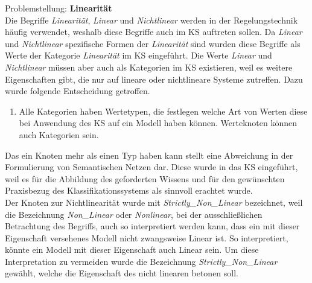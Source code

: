 Problemstellung: \textbf{Linearität}\\
Die Begriffe \textit{Linearität}, \textit{Linear} und \textit{Nichtlinear} werden in der Regelungstechnik häufig verwendet, weshalb diese Begriffe auch im KS auftreten sollen. Da \textit{Linear} und \textit{Nichtlinear} spezifische Formen der \textit{Linearität} sind wurden diese Begriffe als Werte der Kategorie \textit{Linearität} im KS eingeführt. Die Werte \textit{Linear} und \textit{Nichtlinear} müssen aber auch als Kategorien im KS existieren, weil es weitere Eigenschaften gibt, die nur auf lineare oder nichtlineare Systeme zutreffen. Dazu wurde folgende Entscheidung getroffen.
\begin{enumerate}[resume*]
	\item \label{E.KS_Werteknoten}Alle Kategorien haben Wertetypen, die festlegen welche Art von Werten diese bei Anwendung des KS auf ein Modell haben können. Werteknoten können auch Kategorien sein.
\end{enumerate}
Das ein Knoten mehr als einen Typ haben kann stellt eine Abweichung in der Formulierung von Semantischen Netzen dar. Diese wurde in das KS eingeführt, weil es für die Abbildung des geforderten Wissens und für den gewünschten Praxisbezug des Klassifikationssystems als sinnvoll erachtet wurde.\\
Der Knoten zur Nichtlinearität wurde mit \textit{Strictly\_Non\_Linear} bezeichnet, weil die Bezeichnung \textit{Non\_Linear} oder \textit{Nonlinear}, bei der ausschließlichen Betrachtung des Begriffs, auch so interpretiert werden kann, dass ein mit dieser Eigenschaft versehenes Modell nicht zwangsweise Linear ist. So interpretiert, könnte ein Modell mit dieser Eigenschaft auch Linear sein. Um diese Interpretation zu vermeiden wurde die Bezeichnung \textit{Strictly\_Non\_Linear} gewählt, welche die Eigenschaft des nicht linearen betonen soll.\\ 

